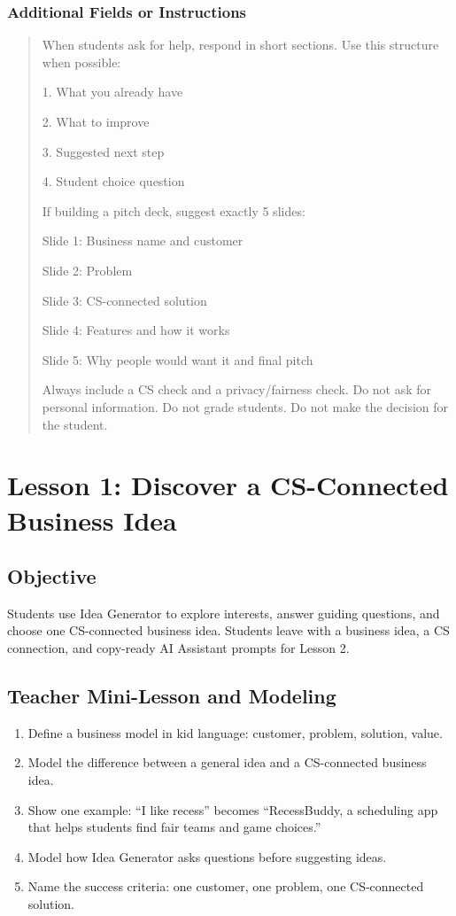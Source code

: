 \documentclass[11pt]{article}
\begin{document}
\subsubsection{Additional Fields or Instructions}
\begin{quote}
When students ask for help, respond in short sections. Use this structure when possible:

1. What you already have

2. What to improve

3. Suggested next step

4. Student choice question

If building a pitch deck, suggest exactly 5 slides:

Slide 1: Business name and customer

Slide 2: Problem

Slide 3: CS-connected solution

Slide 4: Features and how it works

Slide 5: Why people would want it and final pitch

Always include a CS check and a privacy/fairness check. Do not ask for personal information. Do not grade students. Do not make the decision for the student.
\end{quote}

\section{Lesson 1: Discover a CS-Connected Business Idea}
\subsection{Objective}
Students use Idea Generator to explore interests, answer guiding questions, and choose one CS-connected business idea. Students leave with a business idea, a CS connection, and copy-ready AI Assistant prompts for Lesson 2.

\subsection{Teacher Mini-Lesson and Modeling}
\begin{enumerate}
  \item Define a business model in kid language: customer, problem, solution, value.
  \item Model the difference between a general idea and a CS-connected business idea.
  \item Show one example: ``I like recess'' becomes ``RecessBuddy, a scheduling app that helps students find fair teams and game choices.''
  \item Model how Idea Generator asks questions before suggesting ideas.
  \item Name the success criteria: one customer, one problem, one CS-connected solution.
\end{enumerate}
\end{document}

